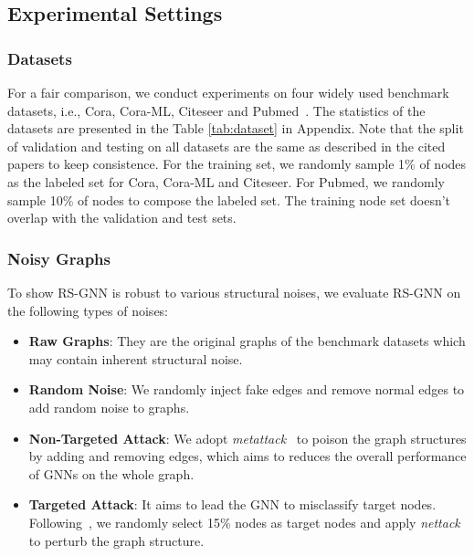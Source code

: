 \subsection{Experimental Settings}
\label{Sec:ex_settings}


\subsubsection{Datasets} 
\label{Sec:datasets}
For a fair comparison, we conduct experiments on four widely used benchmark datasets, i.e., Cora, Cora-ML, Citeseer and Pubmed~\cite{sen2008collective}.
The statistics of the datasets are presented in the Table \ref{tab:dataset} in Appendix. Note that the split of validation and testing on all datasets are the same as described in the cited papers to keep consistence. For the training set, we randomly sample 1\% of nodes as the labeled set for Cora, Cora-ML and Citeseer. For Pubmed, we randomly sample 10\% of nodes to compose the labeled set. The training node set doesn't overlap with the validation and test sets. 

\subsubsection{Noisy Graphs}
To show RS-GNN is robust to various structural noises, we evaluate RS-GNN on the following types of noises:
\begin{itemize}[leftmargin=*]
    \item \textbf{Raw Graphs}: They are the original graphs of the benchmark datasets which may contain inherent structural noise.
    \item \textbf{Random Noise}: We randomly inject fake edges and remove normal edges to add random noise to graphs.
    \item \textbf{Non-Targeted Attack}: 
    We adopt \textit{metattack}~\cite{zugner2019adversarial} to poison the graph structures by adding and removing edges, which aims to reduces the overall performance of GNNs on the whole graph. 
    \item \textbf{Targeted Attack}: It aims to lead the GNN to misclassify target nodes. Following~\cite{tang2020transferring}, we randomly select 15\% nodes as target nodes and apply \textit{nettack}~\cite{zugner2018adversarial} to perturb the graph structure. 

\end{itemize}




